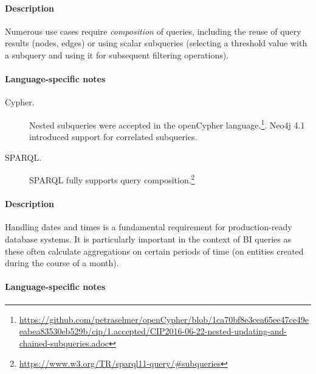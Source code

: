 



\paragraph{Description}

Numerous use cases require \emph{composition} of queries, including the reuse of
query results (\eg nodes, edges) or using scalar subqueries (\eg selecting a
threshold value with a subquery and using it for subsequent filtering
operations).

\paragraph{Language-specific notes}

\begin{description}
\item[Cypher.] Nested subqueries were accepted in the openCypher language.\footnote{\url{https://github.com/petraselmer/openCypher/blob/1ca70bf8e3cea65ee47ce49eeabea83530eb529b/cip/1.accepted/CIP2016-06-22-nested-updating-and-chained-subqueries.adoc}}. Neo4j 4.1 introduced support for correlated subqueries.
\item[SPARQL.] SPARQL fully supports query composition.\footnote{\url{https://www.w3.org/TR/sparql11-query/\#subqueries}}
\end{description}





\paragraph{Description}

Handling dates and times is a fundamental requirement for production-ready
database systems. It is particularly important in the context of BI queries as
these often calculate aggregations on certain periods of time (\eg on entities created during the course of a month).

\paragraph{Language-specific notes}

